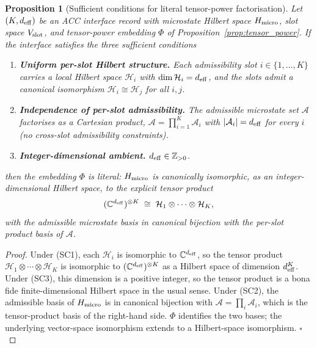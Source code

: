 \documentclass[11pt]{article}
\theoremstyle{plain}
\newtheorem{proposition}[theorem]{Proposition}
\theoremstyle{definition}
\theoremstyle{remark}
\begin{document}
\begin{proposition}[Sufficient conditions for literal tensor-power factorisation]\label{prop:literal_SC}
Let $(K, d_{\rm eff})$ be an ACC interface record with microstate Hilbert space $H_{\rm micro}$, slot space $V_{\rm slot}$, and tensor-power embedding $\Phi$ of Proposition~\ref{prop:tensor_power}.  If the interface satisfies the three sufficient conditions
\begin{enumerate}[leftmargin=2.5em,label=\textup{(SC\arabic*)},itemsep=3pt]
  \item \textbf{Uniform per-slot Hilbert structure.}  Each admissibility slot $i \in \{1, \dots, K\}$ carries a local Hilbert space $\mathcal{H}_i$ with $\dim \mathcal{H}_i = d_{\rm eff}$, and the slots admit a canonical isomorphism $\mathcal{H}_i \cong \mathcal{H}_j$ for all $i, j$.
  \item \textbf{Independence of per-slot admissibility.}  The admissible microstate set $\mathcal{A}$ factorises as a Cartesian product, $\mathcal{A} = \prod_{i=1}^{K} \mathcal{A}_i$ with $|\mathcal{A}_i| = d_{\rm eff}$ for every $i$ (no cross-slot admissibility constraints).
  \item \textbf{Integer-dimensional ambient.}  $d_{\rm eff} \in \mathbb{Z}_{> 0}$.
\end{enumerate}
then the embedding $\Phi$ is \emph{literal}: $H_{\rm micro}$ is canonically isomorphic, as an integer-dimensional Hilbert space, to the explicit tensor product
\[
  (\mathbb{C}^{d_{\rm eff}})^{\otimes K}
  \;\cong\; \mathcal{H}_1 \otimes \cdots \otimes \mathcal{H}_K,
\]
with the admissible microstate basis in canonical bijection with the per-slot product basis of $\mathcal{A}$.
\end{proposition}

\begin{proof}
Under (SC1), each $\mathcal{H}_i$ is isomorphic to $\mathbb{C}^{d_{\rm eff}}$, so the tensor product $\mathcal{H}_1 \otimes \cdots \otimes \mathcal{H}_K$ is isomorphic to $(\mathbb{C}^{d_{\rm eff}})^{\otimes K}$ as a Hilbert space of dimension $d_{\rm eff}^K$.  Under (SC3), this dimension is a positive integer, so the tensor product is a bona fide finite-dimensional Hilbert space in the usual sense.  Under (SC2), the admissible basis of $H_{\rm micro}$ is in canonical bijection with $\mathcal{A} = \prod_i \mathcal{A}_i$, which is the tensor-product basis of the right-hand side.  $\Phi$ identifies the two bases; the underlying vector-space isomorphism extends to a Hilbert-space isomorphism.  $\square$
\end{proof}
\end{document}
